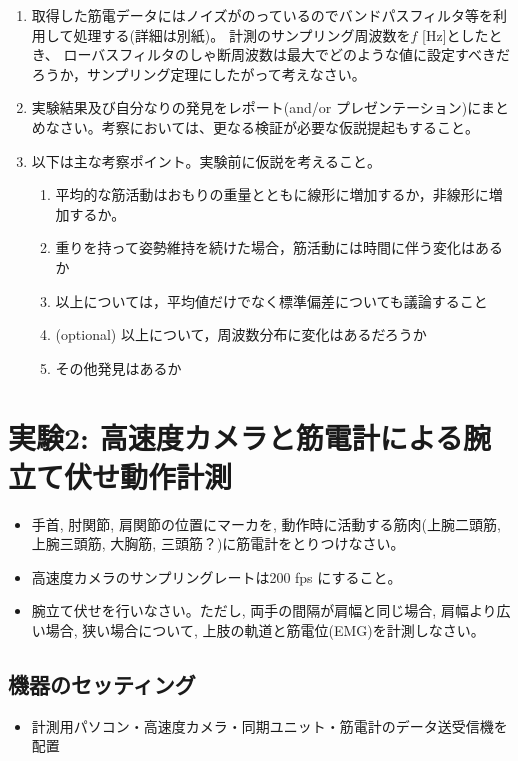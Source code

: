 \documentclass{jsarticle}
\begin{document}
\begin{enumerate}
  \item 取得した筋電データにはノイズがのっているのでバンドパスフィルタ等を利用して処理する(詳細は別紙)。
  計測のサンプリング周波数を$f$ [Hz]としたとき、
  ローバスフィルタのしゃ断周波数は最大でどのような値に設定すべきだろうか，サンプリング定理にしたがって考えなさい。
  \item 実験結果及び自分なりの発見をレポート(and/or プレゼンテーション)にまとめなさい。考察においては、更なる検証が必要な仮説提起もすること。
  \item 以下は主な考察ポイント。実験前に仮説を考えること。
  \begin{enumerate}
    \item 平均的な筋活動はおもりの重量とともに線形に増加するか，非線形に増加するか。
    \item 重りを持って姿勢維持を続けた場合，筋活動には時間に伴う変化はあるか
    \item 以上については，平均値だけでなく標準偏差についても議論すること
    \item (optional) 以上について，周波数分布に変化はあるだろうか
    \item その他発見はあるか
  \end{enumerate}
  
\end{enumerate}


\section{実験2: 高速度カメラと筋電計による腕立て伏せ動作計測}


\begin{itemize}
\item 手首, 肘関節, 肩関節の位置にマーカを, 動作時に活動する筋肉(上腕二頭筋, 上腕三頭筋, 大胸筋, 三頭筋？)に筋電計をとりつけなさい。
\item 高速度カメラのサンプリングレートは200 fps にすること。
\item 腕立て伏せを行いなさい。ただし, 両手の間隔が肩幅と同じ場合, 肩幅より広い場合, 狭い場合について, 上肢の軌道と筋電位(EMG)を計測しなさい。
\end{itemize}


\subsection{機器のセッティング}
\begin{itemize}
\item 計測用パソコン・高速度カメラ・同期ユニット・筋電計のデータ送受信機を配置
\end{itemize}
\end{document}
